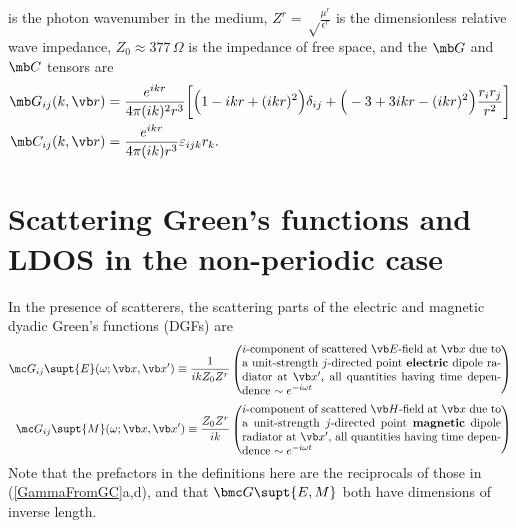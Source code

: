 \documentclass[letterpaper]{article}
\begin{document}
is the photon wavenumber in the medium, 
$Z^r=\sqrt\frac{\mu^r}{\epsilon^r}$ is the dimensionless relative
wave impedance,
$Z_0\approx 377\,\Omega$ is the impedance of free space, and
the $\mb G$ and $\mb C$ tensors are
\begin{subequations}
\begin{align}
\mb G_{ij}(k,\vb r) 
 &= \frac{e^{ikr}}{4\pi (ik)^2 r^3}
    \bigg[ \Big(1-ikr + (ikr)^2 \Big)\delta_{ij}
          +\Big(-3 + 3ikr - (ikr)^2 \Big)\frac{r_i r_j}{r^2}
    \bigg]
\\
\mb C_{ij}(k,\vb r) 
 &= \frac{e^{ikr}}{4\pi (ik) r^3} \varepsilon_{ijk} r_k.
\end{align}
\label{GCDef}
\end{subequations}

\newpage
\section{Scattering Green's functions and LDOS in the non-periodic case}

In the presence of scatterers, the scattering parts of the electric
and magnetic dyadic Green's functions (DGFs) are
\begin{align*}
 \mc G_{ij}\supt{E}(\omega; \vb x, \vb x^\prime)
   \equiv
   \frac{1}{ikZ_0 Z^r}
  &\left( \parbox{0.65\textwidth}
    { $i$-component of scattered $\vb E$-field at $\vb x$
      due to a unit-strength $j$-directed point \textbf{electric} 
      dipole radiator
      at $\vb x^\prime$, all quantities having time dependence
      $\sim e^{-i\omega t}$
    }
   \right)
\\[5pt]
 \mc G_{ij}\supt{M}(\omega; \vb x, \vb x^\prime)
   \equiv
   \frac{Z_0 Z^r}{ik}
  &\left( \parbox{0.65\textwidth}
    { $i$-component of scattered $\vb H$-field at $\vb x$
      due to a unit-strength $j$-directed point \textbf{magnetic}
      dipole radiator
      at $\vb x^\prime$, all quantities having time dependence
      $\sim e^{-i\omega t}$
    }
   \right)
\end{align*}
Note that the prefactors in the definitions here are the reciprocals
of those in (\ref{GammaFromGC}a,d), and that
$\bmc G\supt{E,M}$ both have dimensions of inverse
length.
\end{document}
